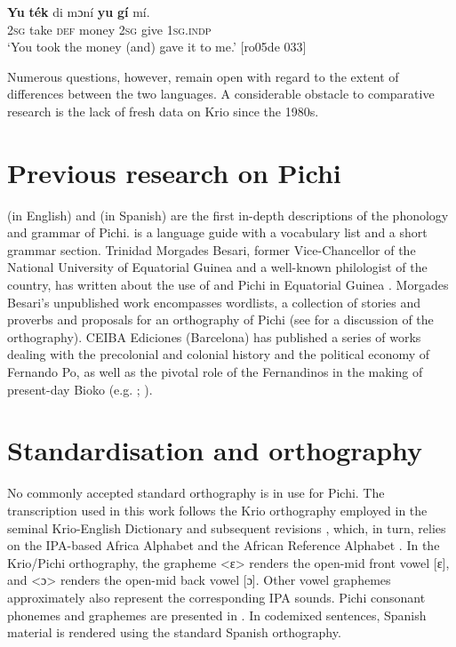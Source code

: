 \ea%
    \label{ex:1:21}
    \gll   \textbf{Yu}  \textbf{ték}    di  mɔní  \textbf{yu}  \textbf{gí}  mí.\\
\textsc{2sg}  take    \textsc{def}  money  \textsc{2sg}  give  \textsc{1sg.indp}\\

\glt ‘You took the money (and) gave it to me.’ [ro05de 033]
\z

Numerous questions, however, remain open with regard to the extent of differences between the two languages. A considerable obstacle to comparative research is the lack of fresh data on Krio since the 1980s.

\section{Previous research on Pichi}\label{sec:1.5}

\citealt{Yakpo2009a} (in English) and \citeyear{Yakpo2010} (in Spanish) are the first in-depth descriptions of the phonology and grammar of Pichi. \citet{Zarco1938} is a language guide with a vocabulary list and a short grammar section. Trinidad Morgades Besari, former Vice-Chancellor of the National University of Equatorial Guinea and a well-known philologist of the country, has written about the use of  and Pichi in Equatorial Guinea \citep{MorgadesBesari2005,MorgadesBesari2011}. Morgades Besari’s unpublished work encompasses wordlists, a collection of stories and proverbs and proposals for an orthography of Pichi (see \citealt{Yakpo2011} for a discussion of the orthography). CEIBA Ediciones (Barcelona) has published a series of works dealing with the precolonial and colonial history and the political economy of Fernando Po, as well as the pivotal role of the Fernandinos in the making of present-day Bioko (e.g. \citealt{MartindelMolino1993}; \citealt{Cantús2006}).

\section{Standardisation and orthography}\label{sec:1.6}

No commonly accepted standard orthography is in use for Pichi. The transcription used in this work follows the Krio orthography employed in the seminal Krio-English Dictionary \citep{FyleJones1980} and subsequent revisions \citep{Coomber1992}, which, in turn, relies on the IPA-based Africa Alphabet \citep{InternationalAfricanInstitute1930} and the African Reference Alphabet \citep{UNESCO1981}. In the Krio\slash Pichi orthography, the grapheme <ɛ> renders the open-mid front vowel [ɛ], and <ɔ> renders the open-mid back vowel [ɔ]. Other vowel graphemes approximately also represent the corresponding IPA sounds. Pichi consonant phonemes and graphemes are presented in . In codemixed sentences, Spanish material is rendered using the standard Spanish orthography. 


